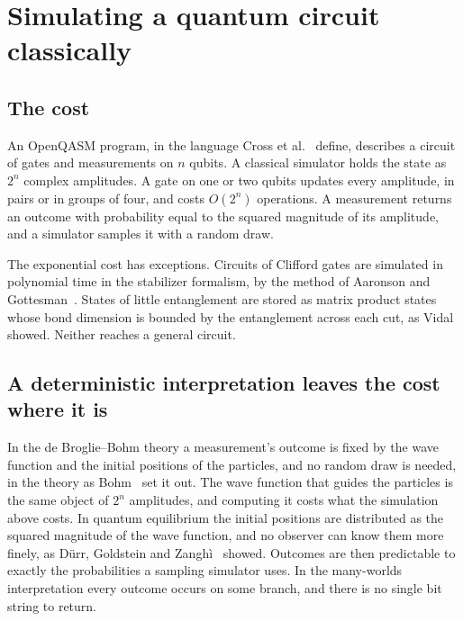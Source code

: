 \chapter{\texorpdfstring{Simulating a quantum circuit classically}{Simulating a quantum circuit classically}}
\label{chap:state-vectors}

\section{\texorpdfstring{The cost}{The cost}}

An OpenQASM program, in the language Cross et al.~\cite{src:OpenQASM-3} define, describes a circuit of gates and measurements on \(n\) qubits. A classical simulator holds the state as \(2^n\) complex amplitudes. A gate on one or two qubits updates every amplitude, in pairs or in groups of four, and costs \(O(2^n)\) operations. A measurement returns an outcome with probability equal to the squared magnitude of its amplitude, and a simulator samples it with a random draw.

The exponential cost has exceptions. Circuits of Clifford gates are simulated in polynomial time in the stabilizer formalism, by the method of Aaronson and Gottesman~\cite{src:Aaronson-Gottesman-2004}. States of little entanglement are stored as matrix product states whose bond dimension is bounded by the entanglement across each cut, as Vidal~\cite{src:Vidal-2003} showed. Neither reaches a general circuit.

\section{\texorpdfstring{A deterministic interpretation leaves the cost where it is}{A deterministic interpretation leaves the cost where it is}}

In the de Broglie–Bohm theory a measurement's outcome is fixed by the wave function and the initial positions of the particles, and no random draw is needed, in the theory as Bohm~\cite{src:Bohm-1952} set it out. The wave function that guides the particles is the same object of \(2^n\) amplitudes, and computing it costs what the simulation above costs. In quantum equilibrium the initial positions are distributed as the squared magnitude of the wave function, and no observer can know them more finely, as Dürr, Goldstein and Zanghì~\cite{src:Durr-Goldstein-Zanghi-1992} showed. Outcomes are then predictable to exactly the probabilities a sampling simulator uses. In the many-worlds interpretation every outcome occurs on some branch, and there is no single bit string to return.

